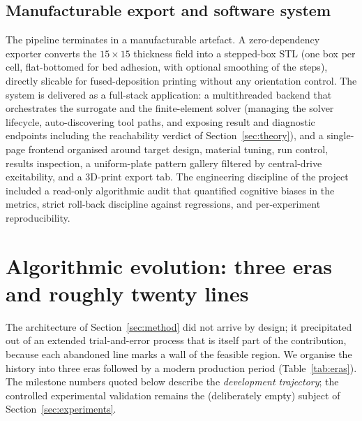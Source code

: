 \documentclass[11pt,a4paper]{article}
\begin{document}
\subsection{Manufacturable export and software system}\label{sec:software}
The pipeline terminates in a manufacturable artefact. A zero-dependency exporter
converts the $15\times15$ thickness field into a stepped-box STL (one box per
cell, flat-bottomed for bed adhesion, with optional smoothing of the steps),
directly slicable for fused-deposition printing without any orientation control.
The system is delivered as a full-stack application: a multithreaded backend that
orchestrates the surrogate and the finite-element solver (managing the solver
lifecycle, auto-discovering tool paths, and exposing result and diagnostic
endpoints including the reachability verdict of Section~\ref{sec:theory}), and a
single-page frontend organised around target design, material tuning, run control,
results inspection, a uniform-plate pattern gallery filtered by central-drive
excitability, and a 3D-print export tab. The engineering discipline of the project
included a read-only algorithmic audit that quantified cognitive biases in the
metrics, strict roll-back discipline against regressions, and per-experiment
reproducibility.

\section{Algorithmic evolution: three eras and roughly twenty lines}\label{sec:eras}

The architecture of Section~\ref{sec:method} did not arrive by design; it
precipitated out of an extended trial-and-error process that is itself part of the
contribution, because each abandoned line marks a wall of the feasible region. We
organise the history into three eras followed by a modern production period
(Table~\ref{tab:eras}). The milestone numbers quoted below describe the
\emph{development trajectory}; the controlled experimental validation remains the
(deliberately empty) subject of Section~\ref{sec:experiments}.
\end{document}
